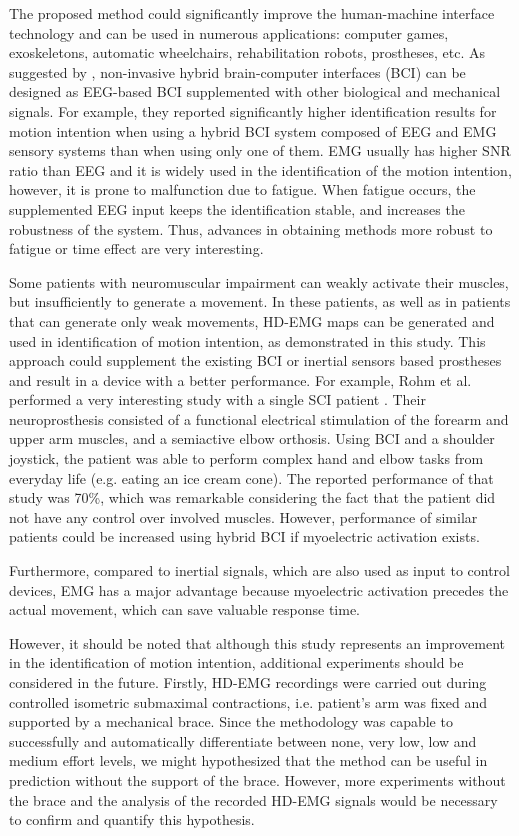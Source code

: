 The proposed method could significantly improve the human-machine interface technology and can be used in numerous applications: computer games, exoskeletons, automatic wheelchairs, rehabilitation robots, prostheses, etc. As suggested by \citet{Muller-Putz2015}, non-invasive hybrid brain-computer interfaces (BCI) can be designed as EEG-based BCI supplemented with other biological and mechanical signals. For example, they reported significantly higher identification results for motion intention when using a hybrid BCI system composed of EEG and EMG sensory systems than when using only one of them. EMG usually has higher SNR ratio than EEG and it is widely used in the identification of the motion intention, however, it is prone to malfunction due to fatigue. When fatigue occurs, the supplemented EEG input keeps the identification stable, and increases the robustness of the system. Thus, advances in obtaining methods more robust to fatigue or time effect are very interesting.

Some patients with neuromuscular impairment can weakly activate their muscles, but insufficiently to generate a movement. In these patients, as well as in patients that can generate only weak movements, HD-EMG maps can be generated and used in identification of motion intention, as demonstrated in this study. This approach could supplement the existing BCI or inertial sensors based prostheses and result in a device with a better performance. For example, Rohm et al. performed a very interesting study with a single SCI patient \citep{Rohm2013}. Their neuroprosthesis consisted of a functional electrical stimulation of the forearm and upper arm muscles, and a semiactive elbow orthosis. Using BCI and a shoulder joystick, the patient was able to perform complex hand and elbow tasks from everyday life (e.g. eating an ice cream cone). The reported performance of that study was 70\%, which was remarkable considering the fact that the patient did not have any control over involved muscles. However, performance of similar patients could be increased using hybrid BCI if myoelectric activation exists.

Furthermore, compared to inertial signals, which are also used as input to control devices, EMG has a major advantage because myoelectric activation precedes the actual movement, which can save valuable response time.

However, it should be noted that although this study represents an improvement in the identification of motion intention, additional experiments should be considered in the future. Firstly, HD-EMG recordings were carried out during controlled isometric submaximal contractions, i.e. patient’s arm was fixed and supported by a mechanical brace. Since the methodology was capable to successfully and automatically differentiate between none, very low, low and medium effort levels, we might hypothesized that the method can be useful in prediction without the support of the brace. However, more experiments without the brace and the analysis of the recorded HD-EMG signals would be necessary to confirm and quantify this hypothesis.



